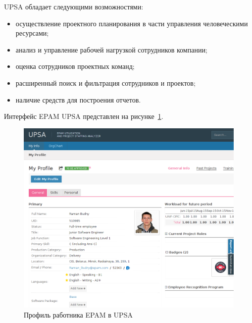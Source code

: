 UPSA обладает следующими возможностями:
\begin{itemize}
\item осуществление проектного планирования в части управления человеческими ресурсами;
\item анализ и управление рабочей нагрузкой сотрудников компании;
\item оценка сотрудников проектных команд;
\item расширенный поиск и фильтрация сотрудников и проектов;
\item наличие средств для построения отчетов.
\end{itemize}

Интерфейс EPAM UPSA представлен на рисунке~\ref{pic:epam_upsa}.

\begin{figure}[h!]
  \centering
  \includegraphics[width=130mm]{fig/epam_upsa.png}
  \caption{Профиль работника EPAM в UPSA}
  \label{pic:epam_upsa}
\end{figure}

